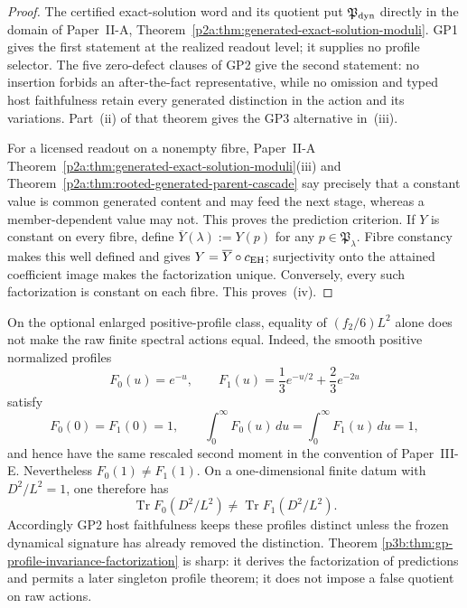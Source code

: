 \documentclass[12pt,a4paper]{article}
\begin{document}
\begin{proof}
The certified exact-solution word and its quotient put
\(\mathfrak P_{\rm dyn}\) directly in the domain of Paper~II-A,
Theorem~\ref{p2a:thm:generated-exact-solution-moduli}.  GP1 gives the first
statement at the realized readout level; it supplies no profile selector.
The five zero-defect clauses of GP2 give the second statement: no insertion
forbids an after-the-fact representative, while no omission and typed host
faithfulness retain every generated distinction in the action and its
variations.  Part~(ii) of that theorem gives the GP3 alternative in~(iii).

For a licensed readout on a nonempty fibre, Paper~II-A
Theorem~\ref{p2a:thm:generated-exact-solution-moduli}(iii) and
Theorem~\ref{p2a:thm:rooted-generated-parent-cascade} say precisely that a
constant value is common generated content and may feed the next stage,
whereas a member-dependent value may not.  This proves the prediction
criterion.  If \(Y\) is constant on every fibre, define
\(\overline Y(\lambda):=Y(p)\) for any
\(p\in\mathfrak P_\lambda\).  Fibre constancy makes this well defined and
gives \(Y=\overline Y\circ c_{\rm EH}\); surjectivity onto the attained
coefficient image makes the factorization unique.  Conversely, every such
factorization is constant on each fibre.  This proves~(iv).
\end{proof}

\begin{proposition}
\label{p3b:prop:profile-invariance-sharpness}
On the optional enlarged positive-profile class, equality of
\((f_2/6)L^2\) alone does not make the raw finite spectral actions equal.
Indeed, the smooth positive normalized profiles
\[
 F_0(u)=e^{-u},\qquad
 F_1(u)=\frac13e^{-u/2}+\frac23e^{-2u}
\]
satisfy
\[
 F_0(0)=F_1(0)=1,\qquad
 \int_0^\infty F_0(u)\,du
 =\int_0^\infty F_1(u)\,du=1,
\]
and hence have the same rescaled second moment in the convention of
Paper~III-E.  Nevertheless \(F_0(1)\ne F_1(1)\).  On a one-dimensional
finite datum with \(D^2/L^2=1\), one therefore has
\[
 \operatorname{Tr}F_0(D^2/L^2)
 \ne
 \operatorname{Tr}F_1(D^2/L^2).
\]
Accordingly GP2 host faithfulness keeps these profiles distinct unless the
frozen dynamical signature has already removed the distinction.  Theorem
\ref{p3b:thm:gp-profile-invariance-factorization} is sharp: it derives the
factorization of predictions and permits a later singleton profile theorem;
it does not impose a false quotient on raw actions.
\end{proposition}
\end{document}
